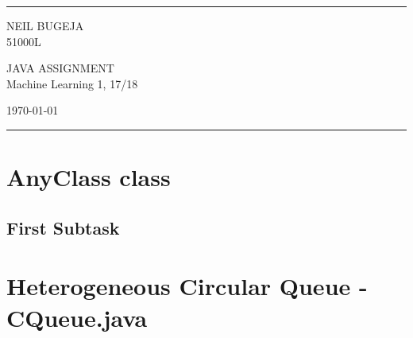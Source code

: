 \documentclass[a4paper]{article}
\begin{document}
\graphicspath{{home/Neil/Computing and business/Year 1/Semester 1/Java-CIS1100/Documentation/Images}}


\fancyhead[C]{}
\hrule \medskip %
\begin{minipage}{0.295\textwidth} 
\raggedright
\footnotesize
NEIL BUGEJA\hfill\\   
51000L\hfill\\
\end{minipage}
\begin{minipage}{0.4\textwidth} 
\centering 
\large 
JAVA ASSIGNMENT\\ 
\normalsize 
Machine Learning 1, 17/18\\ 
\end{minipage}
\begin{minipage}{0.295\textwidth} 
\raggedleft
\today\hfill\\
\end{minipage}
\medskip\hrule 
\bigskip

\section{AnyClass class}
\blindtext
\subsection{First Subtask}

\bigskip

\section{Heterogeneous Circular Queue - CQueue.java}
\end{document}

